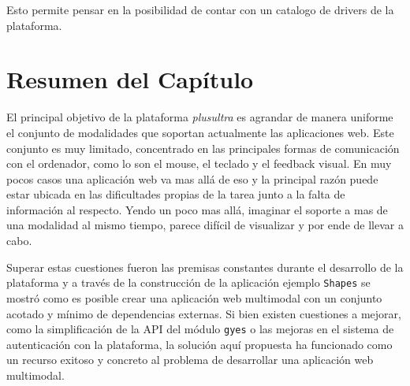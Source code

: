 Esto permite pensar en la posibilidad de contar con un catalogo de drivers de la plataforma.

\section{Resumen del Capítulo}
El principal objetivo de la plataforma \emph{plusultra} es agrandar de manera uniforme el conjunto de modalidades que soportan actualmente las aplicaciones web. Este conjunto  es muy limitado, concentrado en las principales formas de comunicación con el ordenador, como lo son el mouse, el teclado y el feedback visual. En muy pocos casos una aplicación web va mas allá de eso y la principal razón puede estar ubicada en las dificultades propias de la tarea junto a la falta de información al respecto. Yendo un poco mas allá, imaginar el soporte a mas de una modalidad al mismo tiempo, parece difícil de visualizar y por ende de llevar a cabo.

Superar estas cuestiones fueron las premisas constantes durante el desarrollo de la plataforma y a través de la construcción de la aplicación ejemplo \texttt{Shapes} se mostró como es posible crear una aplicación web multimodal con un conjunto acotado y mínimo de  dependencias externas. Si bien existen cuestiones a mejorar, como la simplificación de la API del módulo \texttt{gyes} o las mejoras en el sistema de autenticación con la plataforma, la solución aquí propuesta ha funcionado como un recurso exitoso y concreto al problema de desarrollar una aplicación web multimodal.